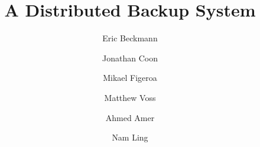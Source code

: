 \documentclass{scu-thesis}
\author{Eric Beckmann}
\author{Jonathan Coon}
\author{Mikael Figeroa}
\author{Matthew Voss}
\title{A Distributed Backup System}
\begin{document}
\frontmatter
\signature{Ahmed Amer}
\signature{Nam Ling}

\maketitle


\tableofcontents
\listoffigures

\mainmatter



\backmatter
\end{document}
